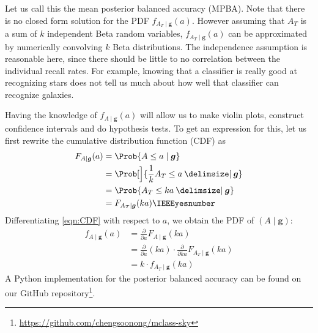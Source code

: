 \documentclass[fleqn,10pt,lineno]{wlpeerj} %
\providecommand\given{}
\renewcommand\given{  \nonscript\:
		\delimsize\vert
		\nonscript\:
		\mathopen{}
		\allowbreak}
\renewcommand\given{  \nonscript\:
		\delimsize\vert
		\nonscript\:
		\mathopen{}
		\allowbreak}
\begin{document}
Let us call this the mean posterior balanced accuracy (MPBA). Note that there
is no closed form solution for the PDF $f_{A_T \mid \bm{g}}(a)$. However
assuming that $A_T$ is a sum of $k$ independent Beta random variables, $f_{A_T
\mid \bm{g}}(a)$ can be approximated by numerically convolving $k$ Beta
distributions. The independence assumption is reasonable here, since there
should be little to no correlation between the individual recall rates. For
example, knowing that a classifier is really good at recognizing stars does not
tell us much about how well that classifier can recognize galaxies.

Having the knowledge of $f_{A \mid \bm{g}}(a)$ will allow us to make violin
plots, construct confidence intervals and do hypothesis tests. To get an
expression for this, let us first rewrite the cumulative distribution function
(CDF) as
	\begin{align}
		F_{A\mid \bm{g}}(a) &= \Prob{A \leq a \mid \bm{g}} \\
		&= \Prob[\Big]{\frac{1}{k} A_T \leq a \given \bm{g}} \\
		&= \Prob{A_T \leq ka \given \bm{g}} \\
		&= F_{A_T \mid \bm{g}}(ka) \IEEEyesnumber \label{eqn:CDF}
	\end{align}
Differentiating \eqref{eqn:CDF} with respect to $a$, we obtain the PDF of $(A \mid \bm{g})$:
	\begin{align}
		f_{A \mid \bm{g}}(a) &= \frac{\partial}{\partial a} F_{A \mid \bm{g}}(ka) \\
		&= \frac{\partial}{\partial a} (ka) \cdot \frac{\partial}{\partial ka}
			F_{A_T \mid \bm{g}}(ka) \\
		&= k \cdot f_{A_T \mid \bm{g}}(ka)
	\end{align}
A Python implementation for the posterior balanced accuracy can be found
on our GitHub repository\footnote{\url{https://github.com/chengsoonong/mclass-sky}}.
\end{document}
